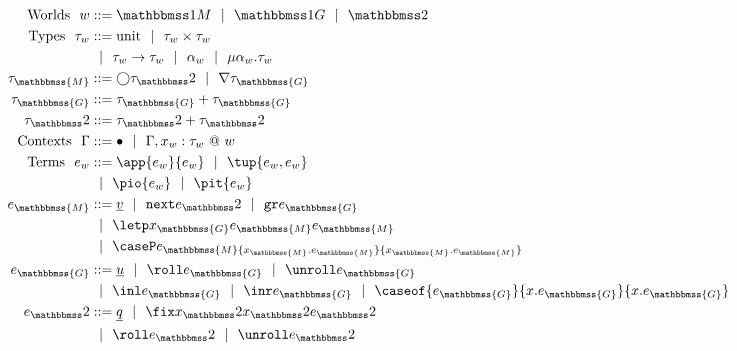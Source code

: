 
\newcommand{\exprM}{e_\mathbbmss{M}}
\newcommand{\exprG}{e_\mathbbmss{G}}
\newcommand{\exprT}{e_\bbtwo}
\newcommand{\varM}{x_\mathbbmss{M}}
\newcommand{\varG}{x_\mathbbmss{G}}
\newcommand{\varT}{x_\bbtwo}
\newcommand{\typeM}{\tau_\mathbbmss{M}}
\newcommand{\typeG}{\tau_\mathbbmss{G}}
\newcommand{\typeT}{\tau_\bbtwo}

\begin{figure}[t]
\begin{abstrsyn}
\[\begin{aligned}
\text{Worlds}\ \ 
\world &::= \bbonem \gbar \bbonep \gbar \bbtwo  \\
%
\text{Types}\ \ 
\type_w &::= \text{unit}
 \gbar \type_w \times \type_w \\
&\gbar \type_w \to \type_w
 \gbar \alpha_w \gbar \mu \alpha_w.\tau_w \\
\typeM &::= \fut \typeT \gbar \curr \typeG \\
%
\typeG &::= \typeG + \typeG \\
%
\typeT &::= \typeT + \typeT \\
%
%
\text{Contexts}\ \ 
\context &::=\emptyC
 \gbar \context, x_w:\tau_w~@~w \\
%
\text{Terms}\ \ 
e_w &::= \app {e_w} {e_w} 
 \gbar \tup{e_w, e_w} \\
&\gbar \pio {e_w} 
 \gbar \pit {e_w} \\
\exprM &::= \exv v
 \gbar \next \exprT 
 \gbar \pure \exprG \\
&\gbar \letp \varG \exprM \exprM \\
&\gbar \caseP \exprM {\varM.\exprM} {\varM.\exprM} \\
\exprG &::= \exv u
 \gbar \roll \exprG \gbar \unroll \exprG \\
&\gbar \inl \exprG \gbar \inr \exprG
 \gbar \caseof {\exprG}{\var.\exprG}{\var.\exprG} \\ 
\exprT &::= \exv q
 \gbar \fix \varT \varT \exprT \\
&\gbar \roll \exprT \gbar \unroll \exprT \\

\end{aligned}\]
\end{abstrsyn}
\end{figure}
